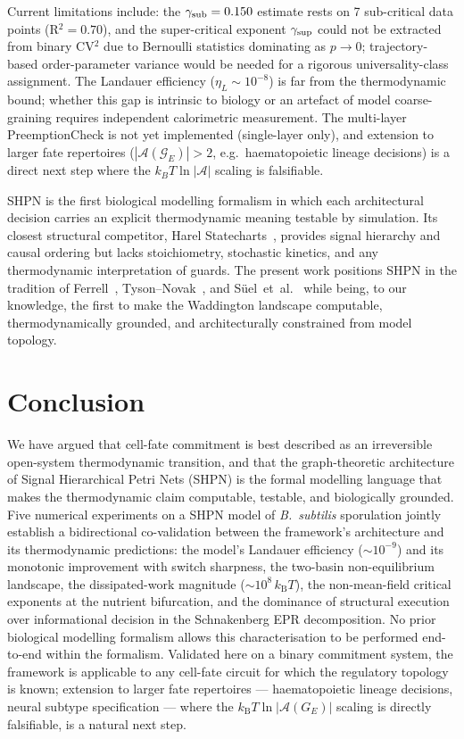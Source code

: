 \documentclass[11pt,a4paper]{article}
\newcommand{\kB}{k_{\mathrm{B}}}
\newcommand{\Ge}{G_E}
\newcommand{\Aset}{\mathcal{A}}
\begin{document}
Current limitations include: the $\gamma_{\rm sub} = 0.150$ estimate
rests on 7 sub-critical data points (R$^2 = 0.70$), and the
super-critical exponent $\gamma_{\rm sup}$ could not be extracted from
binary CV$^2$ due to Bernoulli statistics dominating as $p \to 0$;
trajectory-based order-parameter variance would be needed for a
rigorous universality-class assignment.
The Landauer efficiency ($\eta_L \sim 10^{-8}$) is far from the
thermodynamic bound; whether this gap is intrinsic to biology or
an artefact of model coarse-graining requires independent calorimetric
measurement.
The multi-layer PreemptionCheck is not yet implemented
(single-layer only), and extension to larger fate repertoires
($|\mathcal{A}(\mathcal{G}_E)| > 2$, e.g.\ haematopoietic lineage
decisions) is a direct next step where the $k_BT \ln|\mathcal{A}|$
scaling is falsifiable.

SHPN is the first biological modelling formalism in which each
architectural decision carries an explicit thermodynamic meaning
testable by simulation.
Its closest structural competitor, Harel Statecharts~\cite{Harel1987},
provides signal hierarchy and causal ordering but lacks stoichiometry,
stochastic kinetics, and any thermodynamic interpretation of guards.
The present work positions SHPN in the tradition of Ferrell~\cite{Ferrell1998},
Tyson–Novak~\cite{TysonNovak2001}, and S{\"u}el~et~al.~\cite{Suel2007}
while being, to our knowledge, the first to make the Waddington landscape
computable, thermodynamically grounded, and architecturally constrained
from model topology.

\section{Conclusion}
\label{sec:conclusion}

We have argued that cell-fate commitment is best described as an
irreversible open-system thermodynamic transition, and that the
graph-theoretic architecture of Signal Hierarchical Petri Nets (SHPN) is the formal
modelling language that makes the thermodynamic claim computable,
testable, and biologically grounded.  Five numerical experiments on a
SHPN model of \textit{B.~subtilis} sporulation jointly establish a
bidirectional co-validation between the framework's architecture and its
thermodynamic predictions: the model's Landauer efficiency
(\(\sim 10^{-9}\)) and its monotonic improvement with switch sharpness,
the two-basin non-equilibrium landscape, the dissipated-work magnitude
(\(\sim 10^{8}\,\kB T\)), the non-mean-field critical exponents at the
nutrient bifurcation, and the dominance of structural execution over
informational decision in the Schnakenberg EPR decomposition.  No prior
biological modelling formalism allows this characterisation to be
performed end-to-end within the formalism.  Validated here on a binary
commitment system, the framework is applicable to any cell-fate
circuit for which the regulatory topology is known; extension to larger
fate repertoires --- haematopoietic lineage decisions, neural subtype
specification --- where the \(\kB T \ln|\Aset(\Ge)|\) scaling is
directly falsifiable, is a natural next step.
\end{document}
